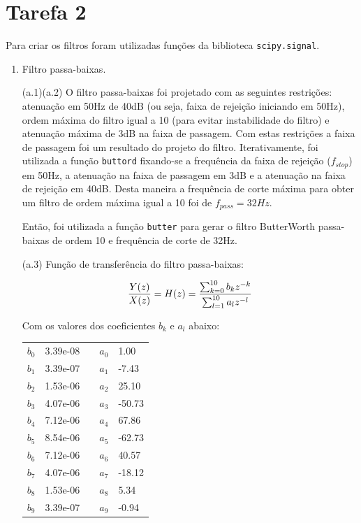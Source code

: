 \documentclass[12pt,letterpaper]{article}
\begin{document}
\begin{enumerate}[label=(\alph*)]
    
\end{enumerate}

\section*{Tarefa 2}
Para criar os filtros foram utilizadas funções da biblioteca \lstinline{scipy.signal}.
\begin{enumerate}[label=(\alph*)]  %
    \item Filtro passa-baixas.
    
    (a.1)(a.2) O filtro passa-baixas foi projetado com as seguintes restrições: atenuação em 50Hz de 40dB (ou seja, faixa de rejeição iniciando em 50Hz), ordem máxima do filtro igual a 10 (para evitar instabilidade do filtro) e atenuação máxima de 3dB na faixa de passagem. Com estas restrições a faixa de passagem foi um resultado do projeto do filtro. Iterativamente, foi utilizada a função \lstinline{buttord} fixando-se a frequência da faixa de rejeição ($f_{stop}$) em 50Hz, a atenuação na faixa de passagem em 3dB e a atenuação na faixa de rejeição em 40dB. Desta maneira a frequência de corte máxima para obter um filtro de ordem máxima igual a 10 foi de $f_{pass} = 32Hz$.
    
    Então, foi utilizada a função \lstinline{butter} para gerar o filtro ButterWorth passa-baixas de ordem 10 e frequência de corte de 32Hz.
    
    (a.3) Função de transferência do filtro passa-baixas:
    
    $${Y(z) \over X(z)} = H(z) =
        {
        { \sum_{k=0}^{10}{b_k z^{-k}} }
        \over
        { \sum_{l=1}^{10}{a_l z^{-l}} }
        }
    $$
    
    Com os valores dos coeficientes $b_k$ e $a_l$ abaixo:
    
    \begin{table}
    \centering
    \begin{tabular}{lllll}
        $b_{0}$ & 3.39e-08 & \space & $a_{0}$ & 1.00 \\ 
        $b_{1}$ & 3.39e-07 & \space & $a_{1}$ & -7.43 \\ 
        $b_{2}$ & 1.53e-06 & \space & $a_{2}$ & 25.10 \\ 
        $b_{3}$ & 4.07e-06 & \space & $a_{3}$ & -50.73 \\ 
        $b_{4}$ & 7.12e-06 & \space & $a_{4}$ & 67.86 \\ 
        $b_{5}$ & 8.54e-06 & \space & $a_{5}$ & -62.73 \\ 
        $b_{6}$ & 7.12e-06 & \space & $a_{6}$ & 40.57 \\ 
        $b_{7}$ & 4.07e-06 & \space & $a_{7}$ & -18.12 \\ 
        $b_{8}$ & 1.53e-06 & \space & $a_{8}$ & 5.34 \\ 
        $b_{9}$ & 3.39e-07 & \space & $a_{9}$ & -0.94 \\ 
    \end{tabular}
    \end{table}
    

\end{enumerate}
\end{document}

